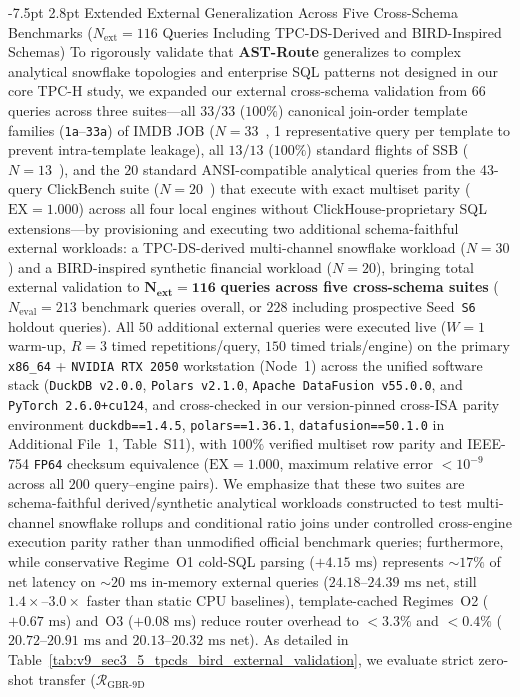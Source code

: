 \documentclass[10pt,a4paper]{article}
\makeatletter
\renewcommand\subsection{\@startsection{subsection}{2}{\z@}%
  {-7.5pt \@plus -2pt \@minus -1pt}%
  {2.8pt \@plus 1pt}%
  {\normalfont\normalsize\bfseries}}
\makeatother
\begin{document}
\subsection{Extended External Generalization Across Five Cross-Schema Benchmarks (\texorpdfstring{$N_{\text{ext}}=116$}{Next=116} Queries Including TPC-DS-Derived and BIRD-Inspired Schemas)}
\label{sec:v9_sec3_5_tpcds_bird_external_validation}
\label{sec:v9_external_130_validation}
To rigorously validate that \textbf{AST-Route} generalizes to complex analytical snowflake topologies and enterprise SQL patterns not designed in our core TPC-H study, we expanded our external cross-schema validation from $66$ queries across three suites---all $33/33$ ($100\%$) canonical join-order template families (\texttt{1a}--\texttt{33a}) of IMDB JOB ($N=33$~\cite{leis2015job}, 1 representative query per template to prevent intra-template leakage), all $13/13$ ($100\%$) standard flights of SSB ($N=13$~\cite{oneil2009ssb}), and the $20$ standard ANSI-compatible analytical queries from the 43-query ClickBench suite ($N=20$~\cite{clickbench2022}) that execute with exact multiset parity ($\text{EX}=1.000$) across all four local engines without ClickHouse-proprietary SQL extensions---by provisioning and executing two additional schema-faithful external workloads: a TPC-DS-derived multi-channel snowflake workload ($N=30$) and a BIRD-inspired synthetic financial workload ($N=20$), bringing total external validation to $\mathbf{N_{\text{ext}}=116}$ \textbf{queries across five cross-schema suites} ($N_{\text{eval}}=213$ benchmark queries overall, or $228$ including prospective Seed~\texttt{S6} holdout queries). All $50$ additional external queries were executed live ($W=1$ warm-up, $R=3$ timed repetitions/query, $150$ timed trials/engine) on the primary \texttt{x86\_64} + \texttt{NVIDIA RTX 2050} workstation (Node~1) across the unified software stack (\texttt{DuckDB v2.0.0}, \texttt{Polars v2.1.0}, \texttt{Apache DataFusion v55.0.0}, and \texttt{PyTorch 2.6.0+cu124}, and cross-checked in our version-pinned cross-ISA parity environment \texttt{duckdb==1.4.5}, \texttt{polars==1.36.1}, \texttt{datafusion==50.1.0} in Additional File~1, Table~S11), with $100\%$ verified multiset row parity and IEEE-754 \texttt{FP64} checksum equivalence ($\text{EX}=1.000$, maximum relative error $< 10^{-9}$ across all $200$ query--engine pairs). We emphasize that these two suites are schema-faithful derived/synthetic analytical workloads constructed to test multi-channel snowflake rollups and conditional ratio joins under controlled cross-engine execution parity rather than unmodified official benchmark queries; furthermore, while conservative Regime~O1 cold-SQL parsing ($+4.15\text{ ms}$) represents $\sim 17\%$ of net latency on $\sim 20\text{ ms}$ in-memory external queries ($24.18\text{--}24.39\text{ ms}$ net, still $1.4\times\text{--}3.0\times$ faster than static CPU baselines), template-cached Regimes~O2 ($+0.67\text{ ms}$) and~O3 ($+0.08\text{ ms}$) reduce router overhead to $<3.3\%$ and $<0.4\%$ ($20.72\text{--}20.91\text{ ms}$ and $20.13\text{--}20.32\text{ ms}$ net). As detailed in Table~\ref{tab:v9_sec3_5_tpcds_bird_external_validation}, we evaluate strict zero-shot transfer ($\mathcal{R}_{\text{GBR-9D}}$ 
\end{document}
